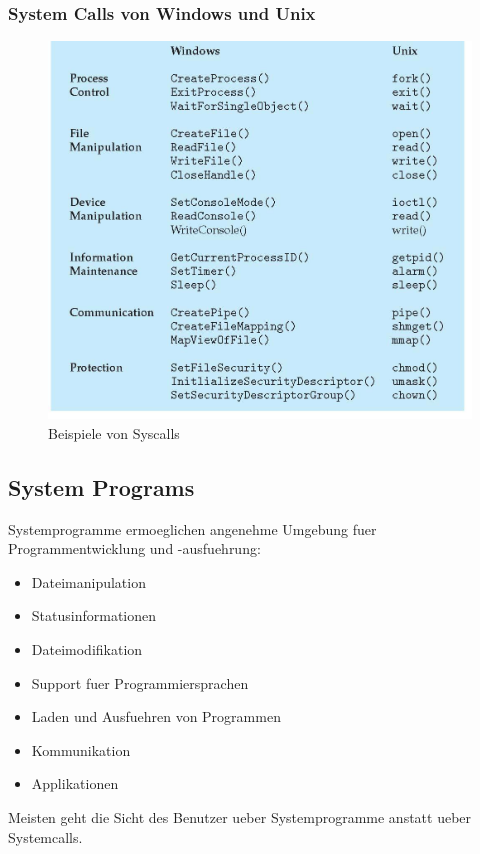 \documentclass[a4paper]{scrreprt}
\begin{document}
\subsubsection{System Calls von Windows und Unix}
\begin{figure}[ht]
\centering
\includegraphics[scale=0.3]{graphics/syscall_examples.png}
\caption{Beispiele von Syscalls}
\end{figure}

\subsection{System Programs}
Systemprogramme ermoeglichen angenehme Umgebung fuer Programmentwicklung und -ausfuehrung:
\begin{itemize}
	\item Dateimanipulation
	\item Statusinformationen
	\item Dateimodifikation
	\item Support fuer Programmiersprachen
	\item Laden und Ausfuehren von Programmen
	\item Kommunikation
	\item Applikationen
\end{itemize}
Meisten geht die Sicht des Benutzer ueber Systemprogramme anstatt ueber Systemcalls.
\end{document}
